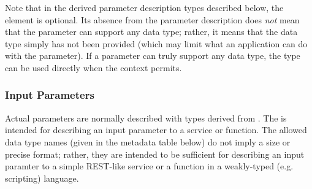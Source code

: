 \documentclass[11pt,a4paper]{ivoa}
\begin{document}
Note that in the derived parameter description types described below,
the  element is optional.  Its absence
from the parameter description does \emph{not} mean that the
parameter can support any data type; rather, it means that the data
type simply has not been provided (which may limit what an application
can do with the parameter).  If a parameter can truly support any data
type, the  type can be used directly when the
context permits.  


\subsubsection{Input Parameters}
\label{sect:inputparam}


Actual parameters are normally described with types derived from
.  The  is intended
for describing an input parameter to a service or function.  The
allowed data type names (given in the metadata table below) do not
imply a size or precise format; rather, they are intended to be
sufficient for describing an input paramter to a simple REST-like
service or a function in a weakly-typed (e.g. scripting) language.  
\end{document}
